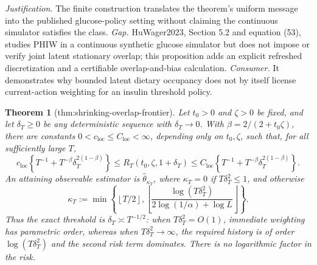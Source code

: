 \documentclass{article}
\newtheorem{theorem}{Theorem}
\begin{document}
\par\smallskip\noindent \textit{Justification.} The finite construction translates the theorem's uniform message into the published glucose-policy setting without claiming the continuous simulator satisfies the class. \textit{Gap.} HuWager2023, Section 5.2 and equation (53), studies PHIW in a continuous synthetic glucose simulator but does not impose or verify joint latent stationary overlap; this proposition adds an explicit refreshed discretization and a certifiable overlap-and-bias calculation. \textit{Consumer.} It demonstrates why bounded latent dietary occupancy does not by itself license current-action weighting for an insulin threshold policy.

\begin{theorem}[thm:shrinking-overlap-frontier]\label{thm:shrinking-overlap-frontier}
Let \(t_0>0\) and \(\zeta>0\) be fixed, and let \(\delta_T\ge0\) be any deterministic sequence with \(\delta_T\to0\).  With \(\beta=2/(2+t_0\zeta)\), there are constants \(0<c_{\mathrm{loc}}\le C_{\mathrm{loc}}<\infty\), depending only on \(t_0,\zeta\), such that, for all sufficiently large \(T\),
\[
 c_{\mathrm{loc}}\left\{T^{-1}+T^{-\beta}\delta_T^{2(1-\beta)}\right\}
 \le R_T(t_0,\zeta,1+\delta_T)
 \le C_{\mathrm{loc}}\left\{T^{-1}+T^{-\beta}\delta_T^{2(1-\beta)}\right\}.
\]
An attaining observable estimator is \(\widehat\theta_{\kappa_T}\), where \(\kappa_T=0\) if \(T\delta_T^2\le1\), and otherwise
\[
 \kappa_T:=\min\!\left\{\left\lfloor T/2\right\rfloor,
 \left\lfloor\frac{\log(T\delta_T^2)}{2\log(1/\alpha)+\log L}\right\rfloor\right\}.
\]
Thus the exact threshold is \(\delta_T\asymp T^{-1/2}\): when \(T\delta_T^2=O(1)\), immediate weighting has parametric order, whereas when \(T\delta_T^2\to\infty\), the required history is of order \(\log(T\delta_T^2)\) and the second risk term dominates.  There is no logarithmic factor in the risk.
\end{theorem}
\end{document}
